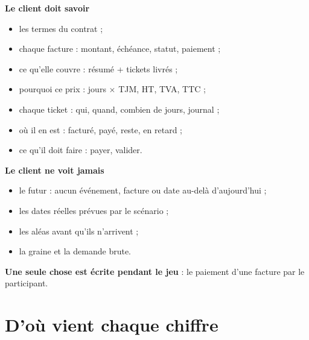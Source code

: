 \documentclass[11pt,a4paper]{article}
\begin{document}
\noindent\begin{minipage}[t]{0.48\linewidth}
\textbf{Le client doit savoir}
\begin{itemize}
  \item les termes du contrat ;
  \item chaque facture : montant, échéance, statut, paiement ;
  \item ce qu'elle couvre : résumé + tickets livrés ;
  \item pourquoi ce prix : jours $\times$ TJM, HT, TVA, TTC ;
  \item chaque ticket : qui, quand, combien de jours, journal ;
  \item où il en est : facturé, payé, reste, en retard ;
  \item ce qu'il doit faire : payer, valider.
\end{itemize}
\end{minipage}\hfill
\begin{minipage}[t]{0.48\linewidth}
\textbf{Le client ne voit jamais}
\begin{itemize}
  \item le futur : aucun événement, facture ou date au-delà d'aujourd'hui ;
  \item les dates réelles prévues par le scénario ;
  \item les aléas avant qu'ils n'arrivent ;
  \item la graine et la demande brute.
\end{itemize}
\medskip
\textbf{Une seule chose est écrite pendant le jeu} : le paiement d'une facture par le participant.
\end{minipage}

\section{D'où vient chaque chiffre}
\end{document}

